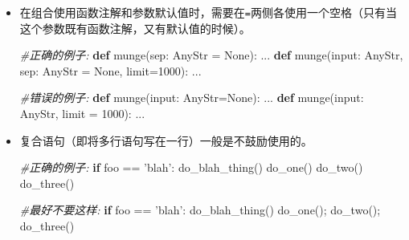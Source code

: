 \documentclass[ignorenonframetext,9pt]{beamer}
\newenvironment{Shaded}{}{}
\newcommand{\BuiltInTok}[1]{#1}
\newcommand{\CommentTok}[1]{\textcolor[rgb]{0.38,0.63,0.69}{\textit{#1}}}
\newcommand{\ControlFlowTok}[1]{\textcolor[rgb]{0.00,0.44,0.13}{\textbf{#1}}}
\newcommand{\DecValTok}[1]{\textcolor[rgb]{0.25,0.63,0.44}{#1}}
\newcommand{\KeywordTok}[1]{\textcolor[rgb]{0.00,0.44,0.13}{\textbf{#1}}}
\newcommand{\NormalTok}[1]{#1}
\newcommand{\OperatorTok}[1]{\textcolor[rgb]{0.40,0.40,0.40}{#1}}
\newcommand{\StringTok}[1]{\textcolor[rgb]{0.25,0.44,0.63}{#1}}
\newcommand{\VariableTok}[1]{\textcolor[rgb]{0.10,0.09,0.49}{#1}}
\begin{document}
\begin{frame}[fragile]

\begin{itemize}
\item
  在组合使用函数注解和参数默认值时，需要在\texttt{=}两侧各使用一个空格（只有当这个参数既有函数注解，又有默认值的时候）。

\begin{Shaded}
\begin{Highlighting}[]
\CommentTok{#正确的例子:}
\KeywordTok{def}\NormalTok{ munge(sep: AnyStr }\OperatorTok{=} \VariableTok{None}\NormalTok{): ...}
\KeywordTok{def}\NormalTok{ munge(}\BuiltInTok{input}\NormalTok{: AnyStr, sep: AnyStr }\OperatorTok{=} \VariableTok{None}\NormalTok{, limit}\OperatorTok{=}\DecValTok{1000}\NormalTok{): ...}

\CommentTok{#错误的例子:}
\KeywordTok{def}\NormalTok{ munge(}\BuiltInTok{input}\NormalTok{: AnyStr}\OperatorTok{=}\VariableTok{None}\NormalTok{): ...}
\KeywordTok{def}\NormalTok{ munge(}\BuiltInTok{input}\NormalTok{: AnyStr, limit }\OperatorTok{=} \DecValTok{1000}\NormalTok{): ...}
\end{Highlighting}
\end{Shaded}
\end{itemize}

\end{frame}

\begin{frame}[fragile]

\begin{itemize}
\item
  复合语句（即将多行语句写在一行）一般是不鼓励使用的。

\begin{Shaded}
\begin{Highlighting}[]
\CommentTok{#正确的例子:}
\ControlFlowTok{if}\NormalTok{ foo }\OperatorTok{==} \StringTok{'blah'}\NormalTok{:}
\NormalTok{do_blah_thing()}
\NormalTok{do_one()}
\NormalTok{do_two()}
\NormalTok{do_three()}

\CommentTok{#最好不要这样:}
\ControlFlowTok{if}\NormalTok{ foo }\OperatorTok{==} \StringTok{'blah'}\NormalTok{: do_blah_thing()}
\NormalTok{do_one()}\OperatorTok{;}\NormalTok{ do_two()}\OperatorTok{;}\NormalTok{ do_three()}
\end{Highlighting}
\end{Shaded}
\end{itemize}

\end{frame}
\end{document}
